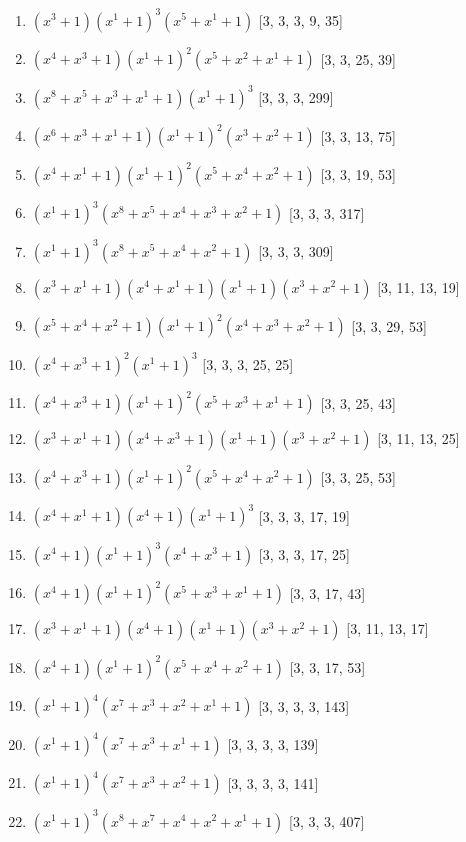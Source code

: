 \documentclass[10pt,twocolumn]{article}
\begin{document}
\begin{enumerate}
\item $(x^{3} + 1)(x^{1} + 1)^{3}(x^{5} + x^{1} + 1)$  [3, 3, 3, 9, 35]
\item $(x^{4} + x^{3} + 1)(x^{1} + 1)^{2}(x^{5} + x^{2} + x^{1} + 1)$  [3, 3, 25, 39]
\item $(x^{8} + x^{5} + x^{3} + x^{1} + 1)(x^{1} + 1)^{3}$  [3, 3, 3, 299]
\item $(x^{6} + x^{3} + x^{1} + 1)(x^{1} + 1)^{2}(x^{3} + x^{2} + 1)$  [3, 3, 13, 75]
\item $(x^{4} + x^{1} + 1)(x^{1} + 1)^{2}(x^{5} + x^{4} + x^{2} + 1)$  [3, 3, 19, 53]
\item $(x^{1} + 1)^{3}(x^{8} + x^{5} + x^{4} + x^{3} + x^{2} + 1)$  [3, 3, 3, 317]
\item $(x^{1} + 1)^{3}(x^{8} + x^{5} + x^{4} + x^{2} + 1)$  [3, 3, 3, 309]
\item $(x^{3} + x^{1} + 1)(x^{4} + x^{1} + 1)(x^{1} + 1)(x^{3} + x^{2} + 1)$  [3, 11, 13, 19]
\item $(x^{5} + x^{4} + x^{2} + 1)(x^{1} + 1)^{2}(x^{4} + x^{3} + x^{2} + 1)$  [3, 3, 29, 53]
\item $(x^{4} + x^{3} + 1)^{2}(x^{1} + 1)^{3}$  [3, 3, 3, 25, 25]
\item $(x^{4} + x^{3} + 1)(x^{1} + 1)^{2}(x^{5} + x^{3} + x^{1} + 1)$  [3, 3, 25, 43]
\item $(x^{3} + x^{1} + 1)(x^{4} + x^{3} + 1)(x^{1} + 1)(x^{3} + x^{2} + 1)$  [3, 11, 13, 25]
\item $(x^{4} + x^{3} + 1)(x^{1} + 1)^{2}(x^{5} + x^{4} + x^{2} + 1)$  [3, 3, 25, 53]
\item $(x^{4} + x^{1} + 1)(x^{4} + 1)(x^{1} + 1)^{3}$  [3, 3, 3, 17, 19]
\item $(x^{4} + 1)(x^{1} + 1)^{3}(x^{4} + x^{3} + 1)$  [3, 3, 3, 17, 25]
\item $(x^{4} + 1)(x^{1} + 1)^{2}(x^{5} + x^{3} + x^{1} + 1)$  [3, 3, 17, 43]
\item $(x^{3} + x^{1} + 1)(x^{4} + 1)(x^{1} + 1)(x^{3} + x^{2} + 1)$  [3, 11, 13, 17]
\item $(x^{4} + 1)(x^{1} + 1)^{2}(x^{5} + x^{4} + x^{2} + 1)$  [3, 3, 17, 53]
\item $(x^{1} + 1)^{4}(x^{7} + x^{3} + x^{2} + x^{1} + 1)$  [3, 3, 3, 3, 143]
\item $(x^{1} + 1)^{4}(x^{7} + x^{3} + x^{1} + 1)$  [3, 3, 3, 3, 139]
\item $(x^{1} + 1)^{4}(x^{7} + x^{3} + x^{2} + 1)$  [3, 3, 3, 3, 141]
\item $(x^{1} + 1)^{3}(x^{8} + x^{7} + x^{4} + x^{2} + x^{1} + 1)$  [3, 3, 3, 407]

\end{enumerate}
\end{document}
